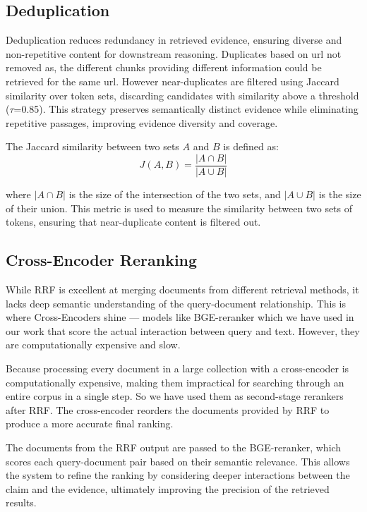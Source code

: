 \subsection{Deduplication}

Deduplication reduces redundancy in retrieved evidence, ensuring diverse and non-repetitive content for downstream reasoning. Duplicates based on url not removed as, the different chunks providing different information could be retrieved for the same url. However near-duplicates are filtered using Jaccard similarity over token sets, discarding candidates with similarity above a threshold ($\tau$=0.85). This strategy preserves semantically distinct evidence while eliminating repetitive passages, improving evidence diversity and coverage.

The Jaccard similarity between two sets $A$ and $B$ is defined as:
\[
J(A, B) = \frac{|A \cap B|}{|A \cup B|}
\]

where $|A \cap B|$ is the size of the intersection of the two sets, and $|A \cup B|$ is the size of their union. This metric is used to measure the similarity between two sets of tokens, ensuring that near-duplicate content is filtered out.

\subsection{Cross-Encoder Reranking}

While RRF is excellent at merging documents from different retrieval methods, it lacks deep semantic understanding of the query-document relationship. This is where Cross-Encoders shine — models like BGE-reranker which we have used in our work that score the actual interaction between query and text. However, they are computationally expensive and slow.

Because processing every document in a large collection with a cross-encoder is computationally expensive, making them impractical for searching through an entire corpus in a single step. So we have used them as second-stage rerankers after RRF. The cross-encoder reorders the documents provided by RRF to produce a more accurate final ranking.

The documents from the RRF output are passed to the BGE-reranker, which scores each query-document pair based on their semantic relevance. This allows the system to refine the ranking by considering deeper interactions between the claim and the evidence, ultimately improving the precision of the retrieved results.

